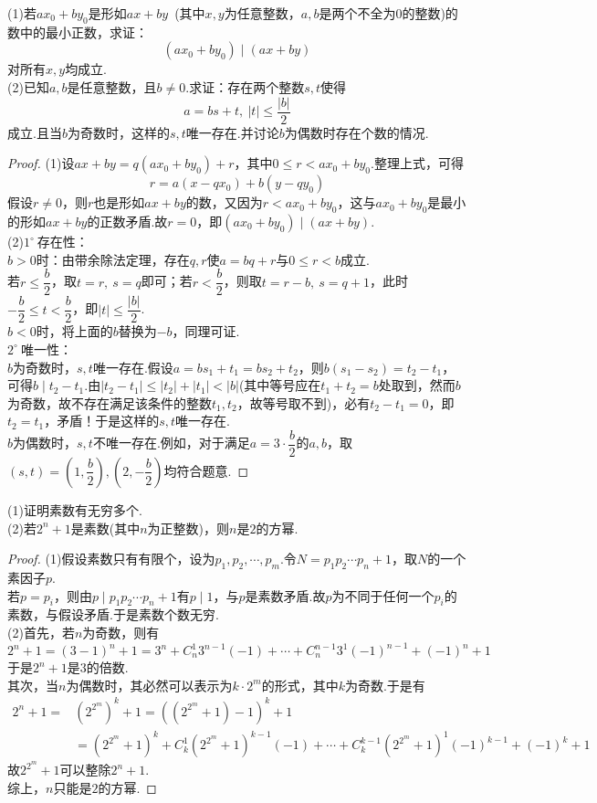 \documentclass[lang=cn, zihao=5]{elegantbook}
\newcommand{\ssb}[1]{\left( #1 \right)}
\newcommand{\buzhou}[1]{$#1^{\circ} \ $}
\begin{document}
\begin{example} %
	(1)若$ax_0+by_0$是形如$ax+by$~(其中$x,y$为任意整数，$a,b$是两个不全为$0$的整数)的数中的最小正数，求证：$$(ax_0+by_0) \mid (ax+by)$$对所有$x,y$均成立. \\
	(2)已知$a,b$是任意整数，且$b \neq 0$.求证：存在两个整数$s,t$使得$$a=bs+t,~|t| \leq \frac{|b|}{2}$$
	成立.且当$b$为奇数时，这样的$s,t$唯一存在.并讨论$b$为偶数时存在个数的情况.
\end{example}
\begin{proof}
	(1)设$ax+by=q(ax_0+by_0)+r$，其中$0 \leq r < ax_0+by_0$.整理上式，可得$$r=a(x-qx_0)+b(y-qy_0)$$
	假设$r \neq 0$，则$r$也是形如$ax+by$的数，又因为$r < ax_0+by_0$，这与$ax_0+by_0$是最小的形如$ax+by$的正数矛盾.故$r=0$，即$(ax_0+by_0) \mid (ax+by)$. \\
	(2)\buzhou{1}存在性： \\
	$b > 0$时：由带余除法定理，存在$q,r$使$a=bq+r$与$0 \leq r <b$成立. \\
	若$r \leq \dfrac{b}{2}$，取$t=r,~s=q$即可；若$r < \dfrac{b}{2}$，则取$t=r-b,~s=q+1$，此时$-\dfrac{b}{2} \leq t < \dfrac{b}{2}$，即$|t| \leq \dfrac{|b|}{2}$. \\
	$b < 0$时，将上面的$b$替换为$-b$，同理可证. \\
	\buzhou{2}唯一性：\\
	$b$为奇数时，$s,t$唯一存在.假设$a=bs_1+t_1=bs_2+t_2$，则$b(s_1-s_2)=t_2-t_1$，可得$b \mid t_2-t_1$.由$|t_2-t_1| \leq |t_2|+|t_1| < |b|$(其中等号应在$t_1+t_2=b$处取到，然而$b$为奇数，故不存在满足该条件的整数$t_1,t_2$，故等号取不到)，必有$t_2-t_1=0$，即$t_2=t_1$，矛盾！于是这样的$s,t$唯一存在. \\
	$b$为偶数时，$s,t$不唯一存在.例如，对于满足$a=3 \cdot \dfrac{b}{2}$的$a,b$，取$(s,t)=(1,\dfrac{b}{2}),(2,-\dfrac{b}{2})$均符合题意.
\end{proof}

\begin{example} %
	(1)证明素数有无穷多个. \\
	(2)若$2^n+1$是素数(其中$n$为正整数)，则$n$是$2$的方幂.
\end{example}
\begin{proof}
	(1)假设素数只有有限个，设为$p_1,p_2, \cdots ,p_m$.令$N=p_1p_2 \cdots p_n + 1$，取$N$的一个素因子$p$.\\
	若$p=p_i$，则由$p \mid p_1p_2\cdots p_n +1$有$p \mid 1$，与$p$是素数矛盾.故$p$为不同于任何一个$p_i$的素数，与假设矛盾.于是素数个数无穷. \\
	(2)首先，若$n$为奇数，则有$$2^n+1 = (3-1)^n+1 = 3^n + C_n^1 3^{n-1}(-1) + \cdots +C_n^{n-1} 3^1 (-1)^{n-1} + (-1)^n + 1$$
	于是$2^n+1$是$3$的倍数. \\
	其次，当$n$为偶数时，其必然可以表示为$k \cdot 2^m$的形式，其中$k$为奇数.于是有
	\begin{align*}
		2^n+1 = &\left( 2^{2^m} \right)^k + 1 = \ssb{ (2^{2^m}+1)-1 }^k + 1 \\
		&= (2^{2^m}+1)^k + C_k^1 (2^{2^m}+1)^{k-1}(-1) + \cdots + C_k^{k-1}(2^{2^m}+1)^1(-1)^{k-1} + (-1)^k + 1
	\end{align*}
	故$2^{2^m}+1$可以整除$2^n+1$. \\
	综上，$n$只能是$2$的方幂.
\end{proof}
\end{document}

